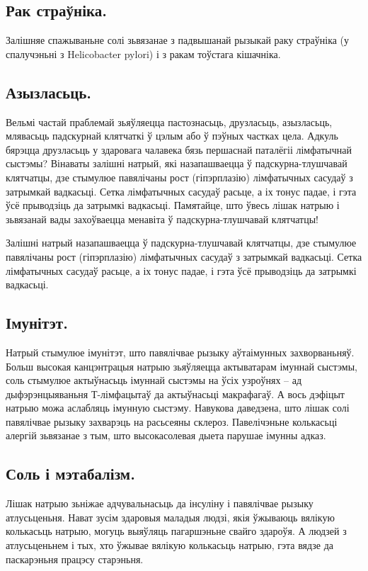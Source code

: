 \subsection{Рак страўніка.}
Залішняе спажываньне солі зьвязанае з падвышанай рызыкай раку страўніка (у спалучэньні з Helicobacter pylori) і з ракам тоўстага кішачніка.

\subsection{Азызласьць.}
Вельмі частай праблемай зьяўляецца пастознасьць, друзласьць, азызласьць, млявасьць падскурнай клятчаткі ў цэлым або ў пэўных частках цела. Адкуль бярэцца друзласьць у здаровага чалавека бязь першаснай паталёгіі лімфатычнай сыстэмы? Вінаваты залішні натрый, які назапашваецца ў падскурна-тлушчавай клятчатцы, дзе стымулюе павялічаны рост (гіпэрплазію) лімфатычных сасудаў з затрымкай вадкасьці. Сетка лімфатычных сасудаў расьце, а іх тонус падае, і гэта ўсё прыводзіць да затрымкі вадкасьці. Памятайце, што ўвесь лішак натрыю і зьвязанай вады захоўваецца менавіта ў падскурна-тлушчавай клятчатцы!

Залішні натрый назапашваецца ў падскурна-тлушчавай клятчатцы, дзе стымулюе павялічаны рост (гіпэрплазію) лімфатычных сасудаў з затрымкай вадкасьці. Сетка лімфатычных сасудаў расьце, а іх тонус падае, і гэта ўсё прыводзіць да затрымкі вадкасьці.

\subsection{Імунітэт.}
Натрый стымулюе імунітэт, што павялічвае рызыку аўтаімунных захворваньняў. Больш высокая канцэнтрацыя натрыю зьяўляецца актыватарам імуннай сыстэмы, соль стымулюе актыўнасьць імуннай сыстэмы на ўсіх узроўнях – ад дыфэрэнцыяваньня Т-лімфацытаў да актыўнасьці макрафагаў. А вось дэфіцыт натрыю можа аслабляць імунную сыстэму. Навукова даведзена, што лішак солі павялічвае рызыку захварэць на расьсеяны склероз. Павелічэньне колькасьці алергій зьвязанае з тым, што высокасолевая дыета парушае імунны адказ.

\subsection{Соль і мэтабалізм.}
Лішак натрыю зьніжае адчувальнасьць да інсуліну і павялічвае рызыку атлусьценьня. Нават зусім здаровыя маладыя людзі, якія ўжываюць вялікую колькасьць натрыю, могуць выяўляць пагаршэньне свайго здароўя. А людзей з атлусьценьнем і тых, хто ўжывае вялікую колькасьць натрыю, гэта вядзе да паскарэньня працэсу старэньня.


